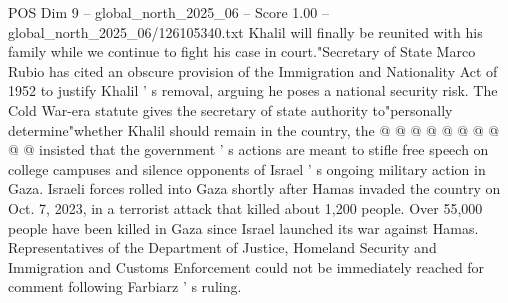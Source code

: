 \begin{textsample}{POS Dim 9 – global\_north\_2025\_06 – Score 1.00 – global\_north\_2025\_06/126105340.txt}
Khalil will finally be reunited with his family while we continue to fight his case in court."Secretary of State Marco Rubio has cited an obscure provision of the Immigration and Nationality Act of 1952 to justify Khalil ' s removal, arguing he poses a national security risk.
The Cold War-era statute gives the secretary of state authority to"personally determine"whether Khalil should remain in the country, the @ @ @ @ @ @ @ @ @ @ insisted that the government ' s actions are meant to stifle free speech on college campuses and silence opponents of Israel ' s ongoing military action in Gaza.
Israeli forces rolled into Gaza shortly after Hamas invaded the country on Oct. 7, 2023, in a terrorist attack that killed about 1,200 people.
Over 55,000 people have been killed in Gaza since Israel launched its war against Hamas.
Representatives of the Department of Justice, Homeland Security and Immigration and Customs Enforcement could not be immediately reached for comment following Farbiarz ' s ruling.

\end{textsample}
